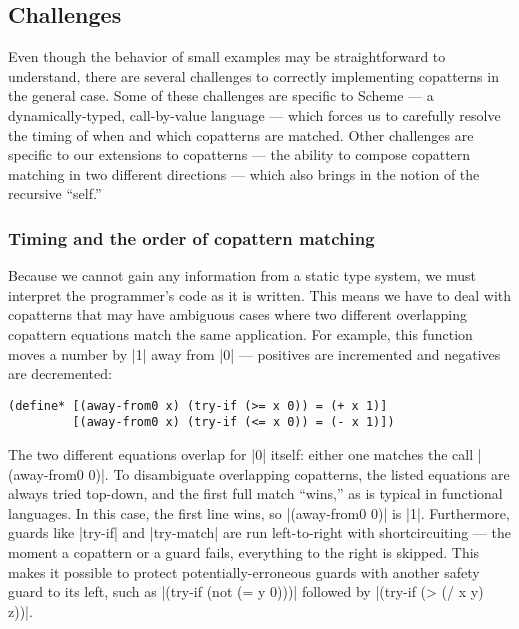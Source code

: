 \subsection{Challenges}

Even though the behavior of small examples may be straightforward to understand, there are several challenges to correctly implementing copatterns in the general case.
Some of these challenges are specific to Scheme --- a dynamically-typed, call-by-value language --- which forces us to carefully resolve the timing of when and which copatterns are matched.
Other challenges are specific to our extensions to copatterns --- the ability to compose copattern matching in two different directions --- which also brings in the notion of the recursive ``self.''

\subsubsection{Timing and the order of copattern matching}
\label{sec:timing-challenges}

Because we cannot gain any information from a static type system, we must interpret the programmer's code as it is written.
This means we have to deal with copatterns that may have ambiguous cases where two different overlapping copattern equations match the same application.
For example, this function moves a number by \scm|1| away from \scm|0| --- positives are incremented and negatives are decremented:
\begin{verbatim}
(define* [(away-from0 x) (try-if (>= x 0)) = (+ x 1)]
         [(away-from0 x) (try-if (<= x 0)) = (- x 1)])
\end{verbatim}
The two different equations overlap for \scm|0| itself: either one matches the call \scm|(away-from0 0)|.
To disambiguate overlapping copatterns, the listed equations are always tried top-down, and the first full match ``wins,'' as is typical in functional languages.
In this case, the first line wins, so \scm|(away-from0 0)| is \scm|1|.
Furthermore, guards like \scm|try-if| and \scm|try-match| are run left-to-right with shortcircuiting --- the moment a copattern or a guard fails, everything to the right is skipped.
This makes it possible to protect potentially-erroneous guards with another safety guard to its left, such as \scm|(try-if (not (= y 0)))| followed by \scm|(try-if (> (/ x y) z))|.

